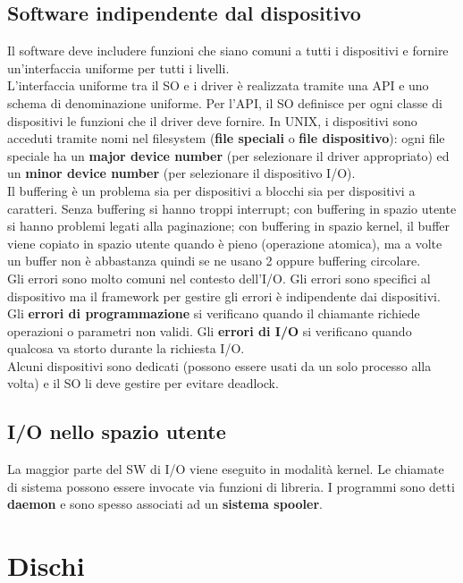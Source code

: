 \documentclass[12pt]{article}
\begin{document}
\subsection{Software indipendente dal dispositivo}
Il software deve includere funzioni che siano comuni a tutti i dispositivi e fornire un'interfaccia uniforme per tutti i 
livelli.\\
L'interfaccia uniforme tra il SO e i driver è realizzata tramite una API e uno schema di denominazione uniforme. Per l'API, 
il SO definisce per ogni classe di dispositivi le funzioni che il driver deve fornire. In UNIX, i dispositivi sono acceduti 
tramite nomi nel filesystem (\textbf{file speciali} o \textbf{file dispositivo}): ogni file speciale ha un \textbf{major device number} 
(per selezionare il driver appropriato) ed un \textbf{minor device number} (per selezionare il dispositivo I/O).\\
Il buffering è un problema sia per dispositivi a blocchi sia per dispositivi a caratteri. Senza buffering si hanno troppi 
interrupt; con buffering in spazio utente si hanno problemi legati alla paginazione; con buffering in spazio kernel, il 
buffer viene copiato in spazio utente quando è pieno (operazione atomica), ma a volte un buffer non è abbastanza quindi 
se ne usano 2 oppure buffering circolare.\\
Gli errori sono molto comuni nel contesto dell'I/O. Gli errori sono specifici al dispositivo ma il framework per gestire 
gli errori è indipendente dai dispositivi. Gli \textbf{errori di programmazione} si verificano quando il chiamante richiede 
operazioni o parametri non validi. Gli \textbf{errori di I/O} si verificano quando qualcosa va storto durante la richiesta 
I/O.\\
Alcuni dispositivi sono dedicati (possono essere usati da un solo processo alla volta) e il SO li deve gestire per evitare 
deadlock.
\subsection{I/O nello spazio utente}
La maggior parte del SW di I/O viene eseguito in modalità kernel. Le chiamate di sistema possono essere invocate via funzioni 
di libreria. I programmi sono detti \textbf{daemon} e sono spesso associati ad un \textbf{sistema spooler}.
\section{Dischi}
\end{document}
